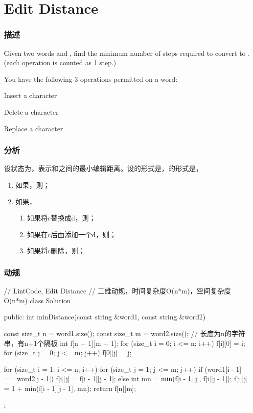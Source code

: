 \section{Edit Distance} %
\label{sec:edit-distance}


\subsubsection{描述}
Given two words  and , find the minimum number of steps required to convert  to . (each operation is counted as 1 step.)

You have the following 3 operations permitted on a word:
\begindot
\item Insert a character
\item Delete a character
\item Replace a character
\myenddot


\subsubsection{分析}
设状态为，表示和之间的最小编辑距离。设的形式是，的形式是，
\begin{enumerate}
\item 如果，则；
\item 如果，
    \begin{enumerate}
        \item 如果将c替换成d，则；
        \item 如果在c后面添加一个d，则；
        \item 如果将c删除，则；
    \end{enumerate}
\end{enumerate}


\subsubsection{动规}
\begin{Code}
// LintCode, Edit Distance
// 二维动规，时间复杂度O(n*m)，空间复杂度O(n*m)
class Solution {
public:
    int minDistance(const string &word1, const string &word2) {
        const size_t n = word1.size();
        const size_t m = word2.size();
        // 长度为n的字符串，有n+1个隔板
        int f[n + 1][m + 1];
        for (size_t i = 0; i <= n; i++)
            f[i][0] = i;
        for (size_t j = 0; j <= m; j++)
            f[0][j] = j;

        for (size_t i = 1; i <= n; i++) {
            for (size_t j = 1; j <= m; j++) {
                if (word1[i - 1] == word2[j - 1])
                    f[i][j] = f[i - 1][j - 1];
                else {
                    int mn = min(f[i - 1][j], f[i][j - 1]);
                    f[i][j] = 1 + min(f[i - 1][j - 1], mn);
                }
            }
        }
        return f[n][m];
    }
};
\end{Code}


